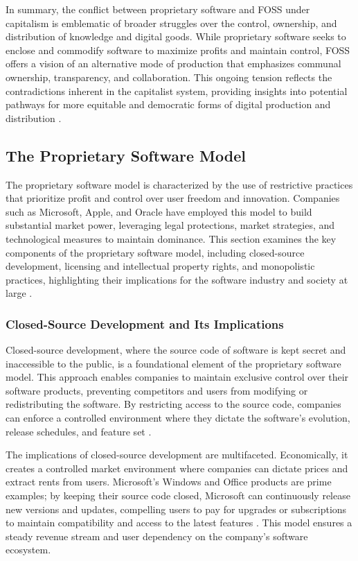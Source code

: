 \begin{refsection}
In summary, the conflict between proprietary software and FOSS under capitalism is emblematic of broader struggles over the control, ownership, and distribution of knowledge and digital goods. While proprietary software seeks to enclose and commodify software to maximize profits and maintain control, FOSS offers a vision of an alternative mode of production that emphasizes communal ownership, transparency, and collaboration. This ongoing tension reflects the contradictions inherent in the capitalist system, providing insights into potential pathways for more equitable and democratic forms of digital production and distribution \cite[pp.~1-25]{marx2008}.

\subsection{The Proprietary Software Model}

The proprietary software model is characterized by the use of restrictive practices that prioritize profit and control over user freedom and innovation. Companies such as Microsoft, Apple, and Oracle have employed this model to build substantial market power, leveraging legal protections, market strategies, and technological measures to maintain dominance. This section examines the key components of the proprietary software model, including closed-source development, licensing and intellectual property rights, and monopolistic practices, highlighting their implications for the software industry and society at large \cite[pp.~110-115]{schiller2000}.

\subsubsection{Closed-Source Development and Its Implications}

Closed-source development, where the source code of software is kept secret and inaccessible to the public, is a foundational element of the proprietary software model. This approach enables companies to maintain exclusive control over their software products, preventing competitors and users from modifying or redistributing the software. By restricting access to the source code, companies can enforce a controlled environment where they dictate the software's evolution, release schedules, and feature set \cite[pp.~45-50]{brooks1995}.

The implications of closed-source development are multifaceted. Economically, it creates a controlled market environment where companies can dictate prices and extract rents from users. Microsoft’s Windows and Office products are prime examples; by keeping their source code closed, Microsoft can continuously release new versions and updates, compelling users to pay for upgrades or subscriptions to maintain compatibility and access to the latest features \cite[pp.~85-90]{stallman2010}. This model ensures a steady revenue stream and user dependency on the company’s software ecosystem.


\end{refsection}
